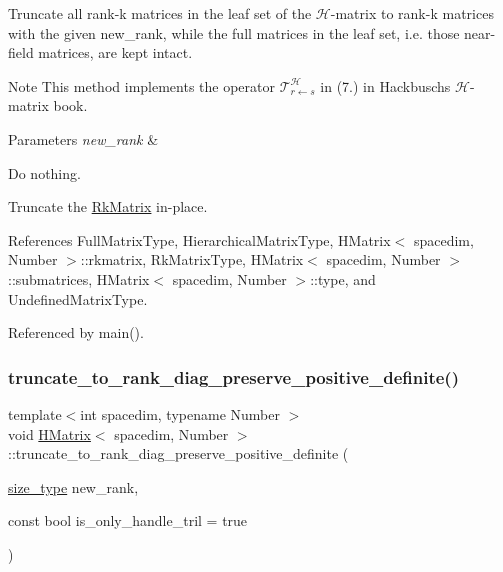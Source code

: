 Truncate all rank-\/k matrices in the leaf set of the $\mathcal{H}$-\/matrix to rank-\/k matrices with the given {\ttfamily new\+\_\+rank}, while the full matrices in the leaf set, i.\+e. those near-\/field matrices, are kept intact.


\begin{DoxyDescription}
\item[Note ]This method implements the operator $\mathcal{T}_{r \leftarrow s}^{\mathcal{H}}$ in (7.) in Hackbusch\textquotesingle{}s $\mathcal{H}$-\/matrix book. 
\end{DoxyDescription}
\begin{DoxyParams}{Parameters}
{\em new\+\_\+rank} & \\
\hline
\end{DoxyParams}
Do nothing.

Truncate the \hyperlink{classRkMatrix}{Rk\+Matrix} in-\/place.

References Full\+Matrix\+Type, Hierarchical\+Matrix\+Type, H\+Matrix$<$ spacedim, Number $>$\+::rkmatrix, Rk\+Matrix\+Type, H\+Matrix$<$ spacedim, Number $>$\+::submatrices, H\+Matrix$<$ spacedim, Number $>$\+::type, and Undefined\+Matrix\+Type.



Referenced by main().

\mbox{\label{classHMatrix_a421beeb0b30d63f286a7905db394bdab}} 
\subsubsection{\texorpdfstring{truncate\+\_\+to\+\_\+rank\+\_\+diag\+\_\+preserve\+\_\+positive\+\_\+definite()}{truncate\_to\_rank\_diag\_preserve\_positive\_definite()}}
{\footnotesize\ttfamily template$<$int spacedim, typename Number $>$ \\
void \hyperlink{classHMatrix}{H\+Matrix}$<$ spacedim, Number $>$\+::truncate\+\_\+to\+\_\+rank\+\_\+diag\+\_\+preserve\+\_\+positive\+\_\+definite (\begin{DoxyParamCaption}\item[{\hyperlink{classHMatrix_a5ca8dc549783d38371a01ecd621ecb34}{size\+\_\+type}}]{new\+\_\+rank,  }\item[{const bool}]{is\+\_\+only\+\_\+handle\+\_\+tril = {\ttfamily true} }\end{DoxyParamCaption})}

